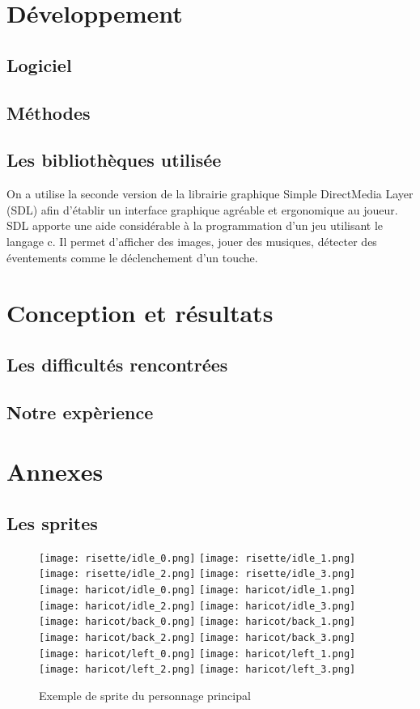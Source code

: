 \documentclass{article}
\begin{document}
\section{Développement}
\subsection{Logiciel}
\subsection{Méthodes}
\subsection{Les bibliothèques utilisée}
On a utilise la seconde version de la librairie graphique Simple DirectMedia Layer (SDL) afin d’établir un interface graphique agréable et ergonomique au joueur. SDL apporte une aide considérable à la programmation d’un jeu utilisant le langage c. Il permet d’afficher des images, jouer des musiques, détecter des éventements comme le déclenchement d’un touche. 
\section{Conception et résultats}
\subsection{Les difficultés rencontrées}
\subsection{Notre expèrience}
\section{Annexes}
\subsection{Les sprites}
\begin{figure}[h]
    \centering
    \texttt{[image: risette/idle\_0.png]}
    \texttt{[image: risette/idle\_1.png]}
    \texttt{[image: risette/idle\_2.png]}
    \texttt{[image: risette/idle\_3.png]}
    \\
    \texttt{[image: haricot/idle\_0.png]}
    \texttt{[image: haricot/idle\_1.png]}
    \texttt{[image: haricot/idle\_2.png]}
    \texttt{[image: haricot/idle\_3.png]}
    \\
    \texttt{[image: haricot/back\_0.png]}
    \texttt{[image: haricot/back\_1.png]}
    \texttt{[image: haricot/back\_2.png]}
    \texttt{[image: haricot/back\_3.png]}
    \\
    \texttt{[image: haricot/left\_0.png]}
    \texttt{[image: haricot/left\_1.png]}
    \texttt{[image: haricot/left\_2.png]}
    \texttt{[image: haricot/left\_3.png]}
    \caption{Exemple de sprite du personnage principal}\label{lapin_devant}
\end{figure}
\end{document}
